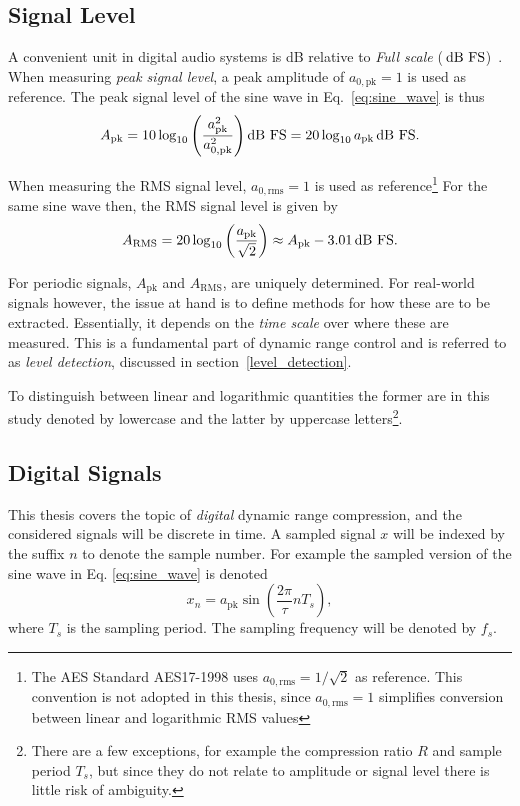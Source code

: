 \documentclass[../main2.tex]{subfiles}
\begin{document}
\subsection{Signal Level}
A convenient unit in digital audio systems is dB relative to \emph{Full scale} ($\mskip3mu\text{dB~FS}$)~\cite{db_fullscale}. When measuring \emph{peak signal level}, a peak amplitude of $a_{0, \text{pk}} = 1$ is used as reference. The peak signal level of the sine wave in Eq.~\eqref{eq:sine_wave} is thus
\begin{equation}
A_\text{pk} = 10 \log_{10} \left( \frac{a_\text{pk}^2}{a_{0, \text{pk}}^2} \right) \text{dB FS} = 20 \log_{10} a_\text{pk} \mskip3mu\text{dB~FS}.
\end{equation}

When measuring the RMS signal level, $a_{0, \text{rms}} = 1$ is used as reference\footnote{The  AES Standard AES17-1998 uses $a_{0, \text{rms}} = 1/\sqrt{2}$ as reference. This convention is not adopted in this thesis, since $a_{0, \text{rms}} = 1$ simplifies conversion between linear and logarithmic RMS values}
For the same sine wave then, the RMS signal level is given by
\begin{equation}
A_\text{RMS} = 20\log_{10} \left( \frac{a_\text{pk}}{\sqrt 2} \right) \approx A_\text{pk}- 3.01 \mskip3mu\text{dB~FS}.
\end{equation}

For periodic signals, $A_\text{pk}$ and $A_\text{RMS}$, are uniquely determined. For real-world signals however, the issue at hand is to define methods for how these are to be extracted. Essentially, it depends on the \emph{time scale} over where these are measured. This is a fundamental part of dynamic range control and is referred to as \emph{level detection}, discussed in section~\ref{level_detection}. 

To distinguish between linear and logarithmic quantities the former are in this study denoted by lowercase and the latter by uppercase letters\footnote{There are a few exceptions, for example the compression ratio $R$ and sample period $T_s$, but since they do not relate to amplitude or signal level there is little risk of ambiguity.}.

\subsection{Digital Signals}
This thesis covers the topic of \emph{digital} dynamic range compression, and the considered signals will be discrete in time. A sampled signal $x$ will be indexed by the suffix $n$ to denote the sample number. For example the sampled version of the sine wave in Eq. \eqref{eq:sine_wave} is denoted
\begin{equation}
x_n = a_\text{pk} \sin \left( \frac{2 \pi}{\tau} n T_s \right),
\end{equation}
where $T_s$ is the sampling period. The sampling frequency will be denoted by $f_s$.
\end{document}
